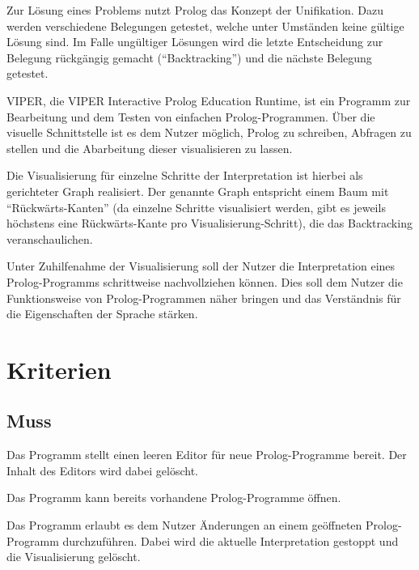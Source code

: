 \documentclass[parskip=full,11pt,twoside]{scrartcl}
\begin{document}
Zur Lösung eines Problems nutzt Prolog das Konzept der Unifikation. Dazu werden verschiedene Belegungen getestet, welche unter Umständen keine gültige Lösung sind. Im Falle ungültiger Lösungen wird die letzte Entscheidung zur Belegung rückgängig gemacht (\enquote{Backtracking}) und die nächste Belegung getestet.

VIPER, die VIPER Interactive Prolog Education Runtime, ist ein Programm zur Bearbeitung und dem Testen von einfachen Prolog-Programmen. Über die visuelle Schnittstelle ist es dem Nutzer möglich, Prolog zu schreiben, Abfragen zu stellen und die Abarbeitung dieser visualisieren zu lassen.

Die Visualisierung für einzelne Schritte der Interpretation ist hierbei als gerichteter Graph realisiert. Der genannte Graph entspricht einem Baum mit \enquote{Rückwärts-Kanten} (da einzelne Schritte visualisiert werden, gibt es jeweils höchstens eine Rückwärts-Kante pro Visualisierung-Schritt), die das Backtracking veranschaulichen.

Unter Zuhilfenahme der Visualisierung soll der Nutzer die Interpretation eines Prolog-Programms schrittweise nachvollziehen können. Dies soll dem Nutzer die Funktionsweise von Prolog-Programmen näher bringen und das Verständnis für die Eigenschaften der Sprache stärken.

\section{Kriterien}

\subsection{Muss}


Das Programm stellt einen leeren Editor für neue Prolog-Programme bereit. Der Inhalt des Editors wird dabei gelöscht.


Das Programm kann bereits vorhandene Prolog-Programme öffnen.


Das Programm erlaubt es dem Nutzer Änderungen an einem geöffneten Prolog-Programm durchzuführen. Dabei wird die aktuelle Interpretation gestoppt und die Visualisierung gelöscht.
\end{document}
